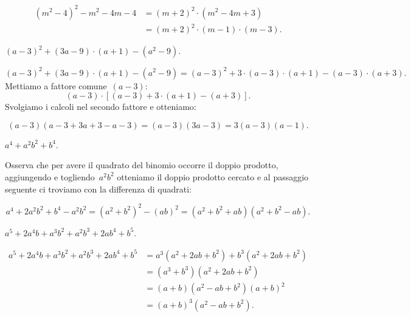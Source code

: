 \begin{exrig}
\begin{esempio}
\begin{align*}
\left(m^{2}-4\right)^2-m^2-4m-4 &=\left(m+2\right)^2\cdot \left( m^2-4m+3 \right)\\
&=\left(m+2\right)^{2}\cdot \left(m-1\right)\cdot \left(m-3\right).
\end{align*}


 \end{esempio}

 \begin{esempio}
 $\left(a-3\right)^{2}+\left(3a-9\right)\cdot\left(a+1\right)-\left(a^{2}-9\right)$.


\begin{equation*}
\left(a-3\right)^{2}+\left(3a-9\right)\cdot\left(a+1\right)-\left(a^{2}-9\right)%
=\left(a-3\right)^{2}+3\cdot \left(a-3\right)\cdot%
\left(a+1\right)-\left(a-3\right)\cdot \left(a+3\right).
\end{equation*}
Mettiamo a fattore comune~$(a-3)$:
\begin{equation*}
(a-3)\cdot \left[\left(a-3\right)+3\cdot
\left(a+1\right)-\left(a+3\right)\right].
\end{equation*}
Svolgiamo i calcoli nel secondo fattore e otteniamo:

\begin{equation*}
(a-3)(a-3+3a+3-a-3)=(a-3)(3a-3)=3(a-3)(a-1).
\end{equation*}
 \end{esempio}

 \begin{esempio}
 $a^4+a^{2}b^{2}+b^4$.

Osserva che per avere il quadrato del binomio occorre il doppio
prodotto, aggiungendo e togliendo~$a^{2}b^{2}$ otteniamo il doppio
prodotto cercato e al passaggio seguente ci troviamo con la differenza
di quadrati:

\[a^4+2a^2b^2+b^4 -a^2b^2=\left(a^2+b^2\right)^2-\left(ab\right)^2%
 =\left(a^2+b^2+ab\right)\left(a^2+b^2-ab\right).\]

 \end{esempio}

 \begin{esempio}
 $a^{5}+2a^{4}b+a^{3}b^{2}+a^{2}b^{3}+2ab^{4}+b^{5}$.

 \begin{align*}
  a^{5}+2a^{4}b+a^{3}b^{2}+a^{2}b^{3}+2ab^{4}+b^{5}&=a^{3}\left(a^{2}+2ab+b^{2}\right)+b^{3}\left(a^{2}+2ab+b^{2}\right)\\
  &=\left(a^{3}+b^{3}\right)\left(a^{2}+2ab+b^{2}\right)\\
  &=\left(a+b\right)\left(a^{2}-ab+b^{2}\right)\left(a+b\right)^{2}\\
  &=\left(a+b\right)^{3}\left(a^{2}-ab+b^{2}\right).
 \end{align*}
 \end{esempio}


\end{exrig}
